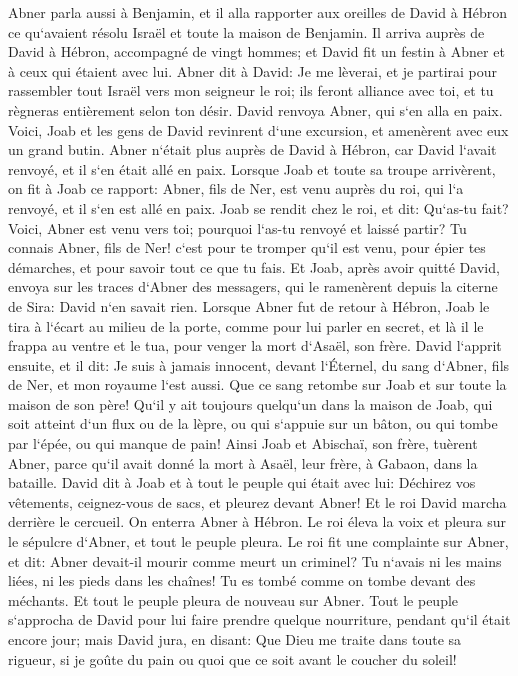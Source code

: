 \verse Abner parla aussi à Benjamin, et il alla rapporter aux oreilles de David à Hébron ce qu`avaient résolu Israël et toute la maison de Benjamin. 
\verse Il arriva auprès de David à Hébron, accompagné de vingt hommes; et David fit un festin à Abner et à ceux qui étaient avec lui. 
\verse Abner dit à David: Je me lèverai, et je partirai pour rassembler tout Israël vers mon seigneur le roi; ils feront alliance avec toi, et tu règneras entièrement selon ton désir. David renvoya Abner, qui s`en alla en paix. 
\verse Voici, Joab et les gens de David revinrent d`une excursion, et amenèrent avec eux un grand butin. Abner n`était plus auprès de David à Hébron, car David l`avait renvoyé, et il s`en était allé en paix. 
\verse Lorsque Joab et toute sa troupe arrivèrent, on fit à Joab ce rapport: Abner, fils de Ner, est venu auprès du roi, qui l`a renvoyé, et il s`en est allé en paix. 
\verse Joab se rendit chez le roi, et dit: Qu`as-tu fait? Voici, Abner est venu vers toi; pourquoi l`as-tu renvoyé et laissé partir? 
\verse Tu connais Abner, fils de Ner! c`est pour te tromper qu`il est venu, pour épier tes démarches, et pour savoir tout ce que tu fais. 
\verse Et Joab, après avoir quitté David, envoya sur les traces d`Abner des messagers, qui le ramenèrent depuis la citerne de Sira: David n`en savait rien. 
\verse Lorsque Abner fut de retour à Hébron, Joab le tira à l`écart au milieu de la porte, comme pour lui parler en secret, et là il le frappa au ventre et le tua, pour venger la mort d`Asaël, son frère. 
\verse David l`apprit ensuite, et il dit: Je suis à jamais innocent, devant l`Éternel, du sang d`Abner, fils de Ner, et mon royaume l`est aussi. 
\verse Que ce sang retombe sur Joab et sur toute la maison de son père! Qu`il y ait toujours quelqu`un dans la maison de Joab, qui soit atteint d`un flux ou de la lèpre, ou qui s`appuie sur un bâton, ou qui tombe par l`épée, ou qui manque de pain! 
\verse Ainsi Joab et Abischaï, son frère, tuèrent Abner, parce qu`il avait donné la mort à Asaël, leur frère, à Gabaon, dans la bataille. 
\verse David dit à Joab et à tout le peuple qui était avec lui: Déchirez vos vêtements, ceignez-vous de sacs, et pleurez devant Abner! Et le roi David marcha derrière le cercueil. 
\verse On enterra Abner à Hébron. Le roi éleva la voix et pleura sur le sépulcre d`Abner, et tout le peuple pleura. 
\verse Le roi fit une complainte sur Abner, et dit: Abner devait-il mourir comme meurt un criminel? 
\verse Tu n`avais ni les mains liées, ni les pieds dans les chaînes! Tu es tombé comme on tombe devant des méchants. 
\verse Et tout le peuple pleura de nouveau sur Abner. Tout le peuple s`approcha de David pour lui faire prendre quelque nourriture, pendant qu`il était encore jour; mais David jura, en disant: Que Dieu me traite dans toute sa rigueur, si je goûte du pain ou quoi que ce soit avant le coucher du soleil! 
